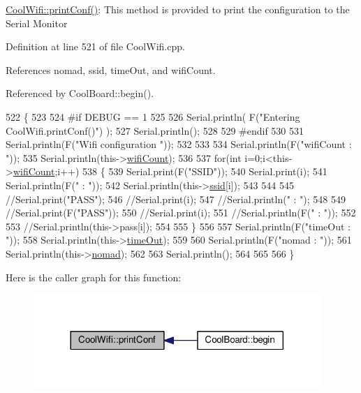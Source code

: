 \hyperlink{classCoolWifi_a9e6105c6d13d35ec510f6633da9e0223}{Cool\+Wifi\+::print\+Conf()}\+: This method is provided to print the configuration to the Serial Monitor 

Definition at line 521 of file Cool\+Wifi.\+cpp.



References nomad, ssid, time\+Out, and wifi\+Count.



Referenced by Cool\+Board\+::begin().


\begin{DoxyCode}
522 \{
523 
524 \textcolor{preprocessor}{#if DEBUG == 1 }
525 
526     Serial.println( F(\textcolor{stringliteral}{"Entering CoolWifi.printConf()"}) );
527     Serial.println();   
528 
529 \textcolor{preprocessor}{#endif}
530     
531     Serial.println(F(\textcolor{stringliteral}{"Wifi configuration "}));
532 
533     
534     Serial.println(F(\textcolor{stringliteral}{"wifiCount : "}));
535     Serial.println(this->\hyperlink{classCoolWifi_ab133bd92fcb895b884deecd6678592e4}{wifiCount});
536     
537     \textcolor{keywordflow}{for}(\textcolor{keywordtype}{int} i=0;i<this->\hyperlink{classCoolWifi_ab133bd92fcb895b884deecd6678592e4}{wifiCount};i++)
538     \{   
539         Serial.print(F(\textcolor{stringliteral}{"SSID"}));
540         Serial.print(i);
541         Serial.println(F(\textcolor{stringliteral}{" : "}));
542         Serial.println(this->\hyperlink{classCoolWifi_a893b21d0fed821438733bba2e73fb4c2}{ssid}[i]);
543                 
544 
545         \textcolor{comment}{//Serial.print("PASS");}
546         \textcolor{comment}{//Serial.print(i);}
547         \textcolor{comment}{//Serial.println(" : ");}
548 
549         \textcolor{comment}{//Serial.print(F("PASS"));}
550         \textcolor{comment}{//Serial.print(i);}
551         \textcolor{comment}{//Serial.println(F(" : "));}
552 
553         \textcolor{comment}{//Serial.println(this->pass[i]);}
554         
555     \}
556     
557     Serial.println(F(\textcolor{stringliteral}{"timeOut : "}));
558     Serial.println(this->\hyperlink{classCoolWifi_a952111605f25156588b5632caaba1c6f}{timeOut});
559 
560     Serial.println(F(\textcolor{stringliteral}{"nomad : "}));
561     Serial.println(this->\hyperlink{classCoolWifi_ab7d9643c4af7bac3be331ef008b2ea27}{nomad});
562 
563     Serial.println();
564 
565 
566 \}
\end{DoxyCode}
Here is the caller graph for this function\+:\nopagebreak
\begin{figure}[H]
\begin{center}
\leavevmode
\includegraphics[width=308pt]{classCoolWifi_a9e6105c6d13d35ec510f6633da9e0223_icgraph}
\end{center}
\end{figure}
